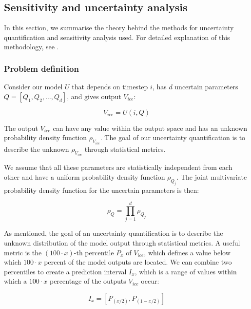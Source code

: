 \documentclass[utf8]{frontiersSCNS}
\begin{document}
\subsection{Sensitivity and uncertainty analysis} \label{sec:uncertainpy}
In this section, we summarise the theory behind the methods for uncertainty quantification and sensitivity
analysis used. For detailed explanation of this methodology, see \cite{uncertainpy_2018}.

\subsubsection{Problem definition}
Consider our model $U$ that depends on timestep $i$, has $d$ uncertain parameters $Q = [Q_1, Q_2, \dots, Q_d]$, and
gives output $V_{ice}$:

\begin{equation}
V_{ice} = U(i,Q)
\end{equation}

The output $V_{ice}$ can have any value within the output space and has an unknown probability density function
$\rho_{V_{ice}}$. The goal of our uncertainty quantification is to describe the unknown $\rho_{V_{ice}}$ through
statistical metrics.

We assume that all these parameters are statistically independent from each other and have a uniform probability
density function $\rho_{Q_j}$. The joint multivariate probability density function for the uncertain parameters
is then:

\begin{equation}
\rho_{Q} = \prod_{j = 1}^{d} \rho_{Q_j}
\end{equation}

As mentioned, the goal of an uncertainty quantification is to describe the unknown distribution of the model
output through statistical metrics. A useful metric is the $(100 \cdot x)$-th percentile $P_x$ of $V_{ice}$,
which defines a value below  which $100 \cdot x$ percent of the model outputs are located. We can combine two
percentiles to create a prediction interval $I_x$, which is a range of values within which a $100 \cdot x$
percentage of the outputs $V_{ice}$ occur: 

\begin{equation}
I_x = [P_{(x/2)}, P_{(1-x/2)}]
\end{equation}
\end{document}
